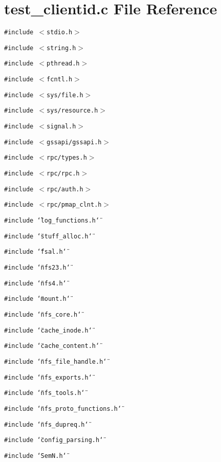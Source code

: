 \section{test\_\-clientid.c File Reference}
\label{test__clientid_8c}
{\tt \#include $<$stdio.h$>$}\par
{\tt \#include $<$string.h$>$}\par
{\tt \#include $<$pthread.h$>$}\par
{\tt \#include $<$fcntl.h$>$}\par
{\tt \#include $<$sys/file.h$>$}\par
{\tt \#include $<$sys/resource.h$>$}\par
{\tt \#include $<$signal.h$>$}\par
{\tt \#include $<$gssapi/gssapi.h$>$}\par
{\tt \#include $<$rpc/types.h$>$}\par
{\tt \#include $<$rpc/rpc.h$>$}\par
{\tt \#include $<$rpc/auth.h$>$}\par
{\tt \#include $<$rpc/pmap\_\-clnt.h$>$}\par
{\tt \#include \char`\"{}log\_\-functions.h\char`\"{}}\par
{\tt \#include \char`\"{}stuff\_\-alloc.h\char`\"{}}\par
{\tt \#include \char`\"{}fsal.h\char`\"{}}\par
{\tt \#include \char`\"{}nfs23.h\char`\"{}}\par
{\tt \#include \char`\"{}nfs4.h\char`\"{}}\par
{\tt \#include \char`\"{}mount.h\char`\"{}}\par
{\tt \#include \char`\"{}nfs\_\-core.h\char`\"{}}\par
{\tt \#include \char`\"{}cache\_\-inode.h\char`\"{}}\par
{\tt \#include \char`\"{}cache\_\-content.h\char`\"{}}\par
{\tt \#include \char`\"{}nfs\_\-file\_\-handle.h\char`\"{}}\par
{\tt \#include \char`\"{}nfs\_\-exports.h\char`\"{}}\par
{\tt \#include \char`\"{}nfs\_\-tools.h\char`\"{}}\par
{\tt \#include \char`\"{}nfs\_\-proto\_\-functions.h\char`\"{}}\par
{\tt \#include \char`\"{}nfs\_\-dupreq.h\char`\"{}}\par
{\tt \#include \char`\"{}config\_\-parsing.h\char`\"{}}\par
{\tt \#include \char`\"{}Sem\-N.h\char`\"{}}\par
